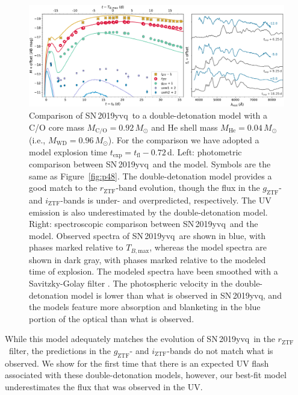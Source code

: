 \documentclass[twocolumn]{aastex63}
\newcommand{\rztf}{$r_\mathrm{ZTF}$}
\newcommand{\gztf}{$g_\mathrm{ZTF}$}
\newcommand{\iztf}{$i_\mathrm{ZTF}$}
\newcommand{\tbmax}{$T_{B,\mathrm{max}}$}
\newcommand{\sn}{SN\,2019yvq}
\begin{document}
\begin{figure}
    \centering
    \includegraphics[width=\textwidth]{./figures/double_det.pdf}
    \caption{Comparison of \sn\ to a double-detonation model with a C/O core
    mass $M_\mathrm{C/O} = 0.92\,M_\odot$ and He shell mass $M_\mathrm{He} =
    0.04\,M_\odot$ (i.e., $M_\mathrm{WD} = 0.96\,M_\odot$). For the comparison
    we have adopted a model explosion time $t_\mathrm{exp} = t_\mathrm{fl} -
    0.72$\,d. Left: photometric comparison between \sn\ and the
    model. Symbols are the same as Figure~\ref{fig:p48}. The double-detonation
    model provides a good match to the \rztf-band evolution, though the flux
    in the \gztf- and \iztf-bands is under- and overpredicted, respectively.
    The UV emission is also underestimated by the double-detonation model.
    Right: spectroscopic comparison between \sn\ and the model.
    Observed spectra of \sn\ are shown in blue, with phases marked relative to
    \tbmax, whereas the model spectra are shown in dark gray, with phases
    marked relative to the modeled time of explosion. The modeled spectra
    have been smoothed with a Savitzky-Golay filter \citep{Savitzky64}. The
    photospheric velocity in the double-detonation model is lower than what is
    observed in \sn, and the models feature more absorption and blanketing in
    the blue portion of the optical than what is observed. }
    \label{fig:double_det}
\end{figure}

While this model adequately matches the evolution of \sn\ in the \rztf\
filter, the predictions in the \gztf- and \iztf-bands do not match what is
observed. We show for the first time that there is an expected UV flash
associated with these double-detonation models, however, our best-fit model
underestimates the flux that was observed in the UV.
\end{document}
